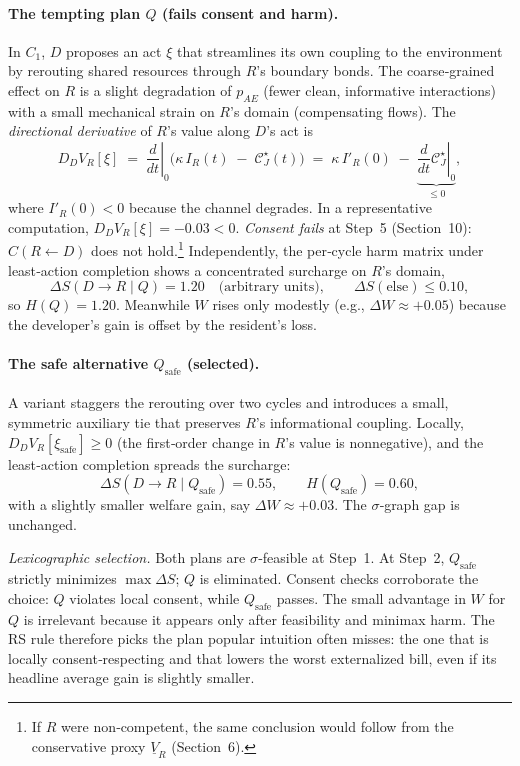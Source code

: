 \documentclass[11pt]{article}
\begin{document}
\paragraph{The tempting plan $Q$ (fails consent and harm).}
In $C_1$, $D$ proposes an act $\xi$ that streamlines its own coupling to the environment by rerouting shared resources through $R$'s boundary bonds. The coarse‑grained effect on $R$ is a slight degradation of $p_{AE}$ (fewer clean, informative interactions) with a small mechanical strain on $R$'s domain (compensating flows). The \emph{directional derivative} of $R$'s value along $D$'s act is
\[
D_D V_R[\xi]\;=\;\left.\frac{d}{dt}\right|_{0}\Big(\kappa\, I_R(t)\;-\;\mathcal{C}_J^\star(t)\Big)\;=\;\kappa\, I'_R(0)\;-\;\underbrace{\left.\frac{d}{dt}\mathcal{C}_J^\star\right|_{0}}_{\le 0},
\]
where $I'_R(0)<0$ because the channel degrades. In a representative computation, $D_D V_R[\xi]=-0.03<0$. \emph{Consent fails} at Step~5 (Section~10): $C(R\!\leftarrow\! D)$ does not hold.\footnote{If $R$ were non‑competent, the same conclusion would follow from the conservative proxy $\underline V_R$ (Section~6).} Independently, the per‑cycle harm matrix under least‑action completion shows a concentrated surcharge on $R$’s domain,
\[
\Delta S(D\!\to\! R\mid Q)=1.20\quad \text{(arbitrary units)},\qquad
\Delta S(\text{else})\le 0.10,
\]
so $H(Q)=1.20$. Meanwhile $W$ rises only modestly (e.g., $\Delta W\approx+0.05$) because the developer’s gain is offset by the resident’s loss.

\paragraph{The safe alternative $Q_{\text{safe}}$ (selected).}
A variant staggers the rerouting over two cycles and introduces a small, symmetric auxiliary tie that preserves $R$'s informational coupling. Locally, $D_D V_R[\xi_{\text{safe}}]\ge 0$ (the first‑order change in $R$'s value is nonnegative), and the least‑action completion spreads the surcharge:
\[
\Delta S(D\!\to\! R\mid Q_{\text{safe}})=0.55,\qquad H(Q_{\text{safe}})=0.60,
\]
with a slightly smaller welfare gain, say $\Delta W\approx+0.03$. The $\sigma$‑graph gap is unchanged.

\emph{Lexicographic selection.} Both plans are $\sigma$‑feasible at Step~1. At Step~2, $Q_{\text{safe}}$ strictly minimizes $\max\Delta S$; $Q$ is eliminated. Consent checks corroborate the choice: $Q$ violates local consent, while $Q_{\text{safe}}$ passes. The small advantage in $W$ for $Q$ is irrelevant because it appears only after feasibility and minimax harm. The RS rule therefore picks the plan popular intuition often misses: the one that is locally consent‑respecting and that lowers the worst externalized bill, even if its headline average gain is slightly smaller.
\end{document}
